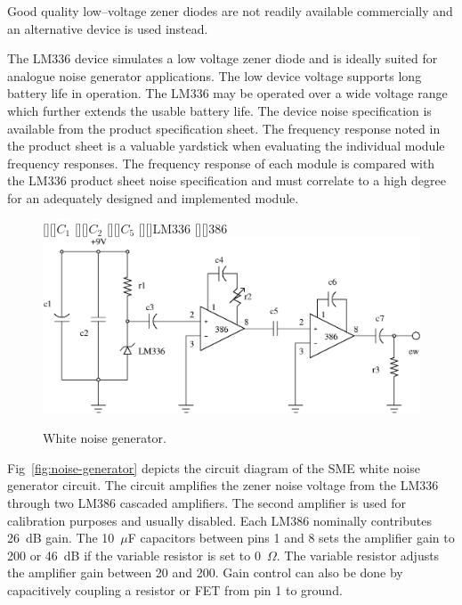 Good quality low--voltage zener diodes are not readily available
commercially and an alternative device is used instead.

The LM336 device simulates a low voltage zener diode and is ideally
suited for analogue noise generator applications. The low device
voltage supports long battery life in operation. The LM336 may be
operated over a wide voltage range which further extends the usable
battery life. The device noise specification is available from the
product specification sheet. The frequency response noted in the
product sheet is a valuable yardstick when evaluating the individual
module frequency responses. The frequency response of each module is
compared with the LM336 product sheet noise specification and must
correlate to a high degree for an adequately designed and implemented
module.

\begin{figure}[htbp]
	\begin{center}
	[][]{\colorbox{white}{$C_1$}}	
	[][]{\colorbox{white}{$C_2$}}	
	[][]{$C_5$}
	\psfrag{+}{+}		
	\psfrag{-}{--}
	[][]{LM336}				
	[][]{386}				
	\includegraphics[width=\textwidth]{noise-generator.eps}
    \caption{White noise generator.}
    \label{fig:noise-generator}
	\end{center}
\end{figure}

Fig~\vref{fig:noise-generator} depicts the circuit diagram of the SME
white noise generator circuit. The circuit amplifies the zener noise
voltage from the LM336 through two LM386 cascaded amplifiers. The
second amplifier is used for calibration purposes and usually
disabled. Each LM386 nominally contributes 26~dB gain. The 10~$\mu$F
capacitors between pins 1 and 8 sets the amplifier gain to 200 or
46~dB if the variable resistor is set to 0~$\Omega$. The variable
resistor adjusts the amplifier gain between 20 and 200. Gain control
can also be done by capacitively coupling a resistor or FET from pin 1
to ground.

